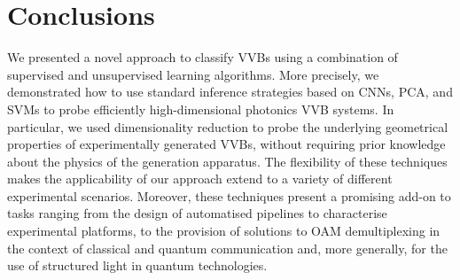 \section{Conclusions}
\label{sec:VVBs:conclusions}

We presented a novel approach to classify \acp{VVB} using a combination of supervised and unsupervised learning algorithms. More precisely, we demonstrated how to use standard inference strategies based on CNNs, PCA, and SVMs to probe efficiently high-dimensional photonics \ac{VVB} systems.
In particular, we used dimensionality reduction to probe the underlying geometrical properties of experimentally generated VVBs, without requiring prior knowledge about the physics of the generation apparatus.
The flexibility of these techniques makes the applicability of our approach extend to a variety of different experimental scenarios.
Moreover, these techniques present a promising add-on to tasks ranging from the design of automatised pipelines to characterise experimental platforms, to the provision of solutions to OAM demultiplexing in the context of classical and quantum communication and, more generally, for the use of structured light in quantum technologies.

